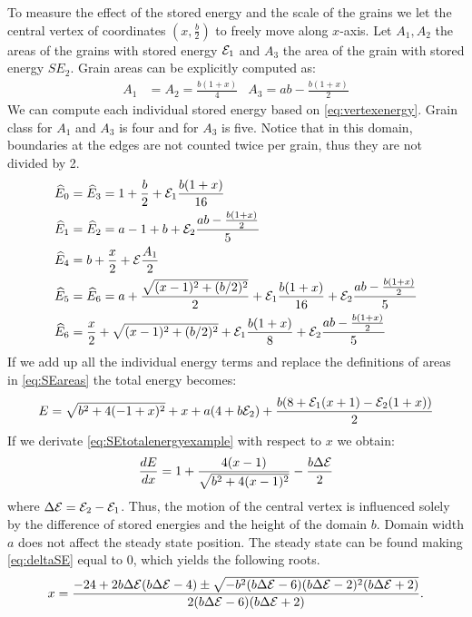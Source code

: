 To measure the effect of the stored energy and the scale of the grains we let the central vertex of coordinates $(x,\frac{b}{2})$ to freely move along $x$-axis. Let $A_1, A_2$ the areas of the grains with stored energy $\mathcal{E}_1$ and $A_3$ the area of the grain with stored energy $SE_2$. Grain areas can be explicitly computed as:
\begin{align}
    A_1 &= A_2 = \frac{b(1+x)}{4} & A_3 = ab - \frac{b(1+x)}{2}
    \label{eq:SEareas}
\end{align}
We can compute each individual stored energy based on \eqref{eq:vertexenergy}. Grain class for $A_1$ and $A_3$ is four and for $A_3$ is five. Notice that in this domain, boundaries at the edges are not counted twice per grain, thus they are not divided by 2. 
\begin{align*}
\widehat{E}_0 &= \widehat{E}_3 = 1+\frac{b}{2} + \mathcal{E}_1\frac{b(1+x)}{16}\\
\widehat{E}_1 &= \widehat{E}_2 = a - 1 + b + \mathcal{E}_2 \frac{a b - \frac{b (1 + x)}{2}}{5}\\
\widehat{E}_4 &= b + \frac{x}{2} + \mathcal{E}\frac{A_1}{2}\\
\widehat{E}_5 &= \widehat{E}_6 = a + \frac{\sqrt{(x-1)^2 + (b/2)^2}}{2} + \mathcal{E}_1\frac{b(1+x)}{16} + \mathcal{E}_2\frac{ab - \frac{b (1 + x)}{2}}{5}\\
\widehat{E}_6 &= \frac{x}{2} + \sqrt{(x-1)^2 + (b/2)^2} + \mathcal{E}_1\frac{b (1 + x)}{8} + \mathcal{E}_2 \frac{a b - \frac{b (1 + x)}{2} }{5}
\end{align*}
If we add up all the individual energy terms and replace the definitions of areas in \eqref{eq:SEareas} the total energy becomes:
\begin{equation}
    E = \sqrt{b^2 + 4 (-1 + x)^2} + x + a (4 + b\mathcal{E}_2) + 
 \frac{b (8 + \mathcal{E}_1(x+1) - \mathcal{E}_2(1 + x))}{2}
    \label{eq:SEtotalenergyexample}
\end{equation}
If we derivate \eqref{eq:SEtotalenergyexample} with respect to $x$ we obtain:
\begin{equation}
    \frac{dE}{dx} = 1 + \frac{4 (x-1)}{\sqrt{b^2 + 4 (x-1)^2}} - \frac{b \Delta \mathcal{E}}{2}
    \label{eq:deltaSE}
\end{equation}
where $\Delta \mathcal{E} = \mathcal{E}_2 - \mathcal{E}_1$. Thus, the motion of the central vertex is influenced solely by the difference of stored energies and the height of the domain $b$. Domain width $a$ does not affect the steady state position. The steady state can be found making \eqref{eq:deltaSE} equal to 0, which yields the following roots.
\begin{equation}
    x=\frac{ -24 + 2 b \Delta \mathcal{E}  (b \Delta \mathcal{E} -4) \pm \sqrt{-b^2 (b \Delta \mathcal{E} -6) (b \Delta \mathcal{E} -2)^2 (b \Delta \mathcal{E} +2)}}{2 (b \Delta \mathcal{E} -6) (b \Delta \mathcal{E} +2)}.
    \label{eq:xpos_steady}
\end{equation}
